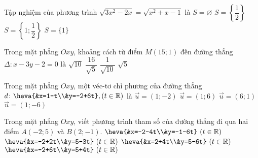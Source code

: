 \begin{ex}%
	Tập nghiệm của phương trình $\sqrt{3x^2-2x}=\sqrt{x^2+x-1}$ là 
	\choice
	{$S=\varnothing$}
	{$S=\left\{\dfrac{1}{2}\right\}$}
	{$S=\left\{1; \dfrac{1}{2}\right\}$}
	{\True $S=\{1\}$}
\end{ex}

\begin{ex}%
	Trong mặt phẳng $Oxy$, khoảng cách từ điểm $M(15; 1)$ đến đường thẳng $\Delta\colon x-3y-2=0$ là
	\choice
	{\True $\sqrt{10}$}
	{$\dfrac{16}{\sqrt{5}}$}
	{$\dfrac{1}{\sqrt{10}}$}
	{$\sqrt{5}$}
\end{ex}

\begin{ex}%
	Trong mặt phẳng $Oxy$, một véc-tơ chỉ phương của đường thẳng $d\colon \heva{&x=1-t\\&y=-2+6t}, (t\in \mathbb{R})$ là
	\choice
	{$\vec{u}=(1;-2)$}
	{$\vec{u}=(1; 6)$}
	{$\vec{u}=(6; 1)$}
	{\True $\vec{u}=(1;-6)$}
\end{ex}

\begin{ex}%
	Trong mặt phẳng $Oxy$, viết phương trình tham số của đường thẳng đi qua hai điểm $A(-2; 5)$ và $B(2;-1)$.
	\choice
	{$\heva{&x=-2-4t\\&y=-1-6t}\,\, (t\in \mathbb{R})$}
	{\True $\heva{&x=-2+2t\\&y=5-3t}\,\, (t\in \mathbb{R})$}
	{$\heva{&x=2+4t\\&y=5-6t}\,\, (t\in \mathbb{R})$}
	{$\heva{&x=-2+6t\\&y=5+4t}\,\, (t\in \mathbb{R})$}
\end{ex}

